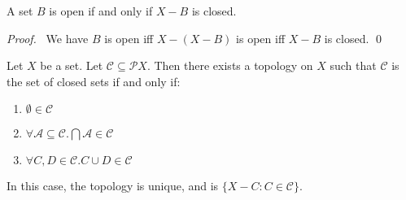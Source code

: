 \begin{prop}
\label{prop:open_closed}
A set $B$ is open if and only if $X - B$ is closed.
\end{prop}

\begin{proof}
\pf\ We have $B$ is open iff $X - (X - B)$ is open iff $X - B$ is closed. \qed
\end{proof}

\begin{thm}
Let $X$ be a set. Let $\mathcal{C} \subseteq \mathcal{P} X$. Then there exists a topology on $X$ such that $\mathcal{C}$ is the set of closed sets if and only if:
\begin{enumerate}
\item $\emptyset \in \mathcal{C}$
\item $\forall \mathcal{A} \subseteq \mathcal{C}. \bigcap \mathcal{A} \in \mathcal{C}$
\item $\forall C,D \in \mathcal{C}. C \cup D \in \mathcal{C}$
\end{enumerate}
In this case, the topology is unique, and is $\{ X - C : C \in \mathcal{C} \}$.
\end{thm}

